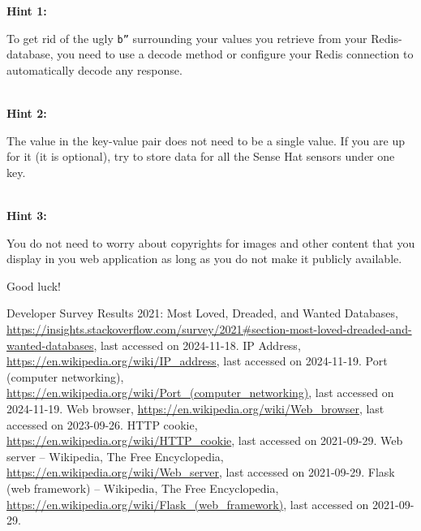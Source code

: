 \documentclass{article}
\begin{document}
{\bf Hint 1: }\parbox[t]{14cm}{To get rid of the ugly \texttt{b''} surrounding your values you retrieve from your Redis-database, you need to use a decode method or configure your Redis connection to automatically decode any response.}\\
{\bf Hint 2: }\parbox[t]{14cm}{The value in the key-value pair does not need to be a single value. If you are up for it (it is optional), try to store data for all the Sense Hat sensors under one key.}\\
{\bf Hint 3: }\parbox[t]{14cm}{You do not need to worry about copyrights for images and other content that you display in you web application as long as you do not make it publicly available.}

\vspace{1cm}
\begin{center}
\huge Good luck!
\end{center}

\begin{thebibliography}{10}

 Developer Survey Results 2021: Most Loved, Dreaded, and Wanted Databases, \url{https://insights.stackoverflow.com/survey/2021#section-most-loved-dreaded-and-wanted-databases}, last accessed on 2024-11-18.
 IP Address, \url{https://en.wikipedia.org/wiki/IP_address}, last accessed on 2024-11-19.
 Port (computer networking), \url{https://en.wikipedia.org/wiki/Port_(computer_networking)}, last accessed on 2024-11-19. Web browser, \url{https://en.wikipedia.org/wiki/Web_browser}, last accessed on 2023-09-26.
 HTTP cookie, \url{https://en.wikipedia.org/wiki/HTTP_cookie}, last accessed on 2021-09-29.
 Web server -- Wikipedia, The Free Encyclopedia, \url{https://en.wikipedia.org/wiki/Web_server}, last accessed on 2021-09-29.
 Flask (web framework) -- Wikipedia, The Free Encyclopedia, \url{https://en.wikipedia.org/wiki/Flask_(web_framework)}, last accessed on 2021-09-29.
\end{thebibliography}
\end{document}
